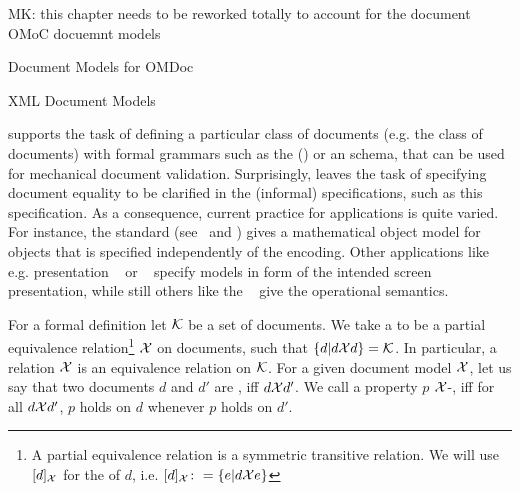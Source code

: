 \begin{oldpart}{MK: this chapter needs to be reworked totally to account for the document
    OMoC docuemnt models}
\begin{tchapter}[id=document-model]{Document Models for OMDoc}
\begin{tsection}[id=xml-DOM]{XML Document Models}

  {\xml} supports the task of defining a particular class of documents (e.g. the class of
  {\omdoc} documents) with formal grammars such as the {} ({}) or an {\xml} schema, that
  can be used for mechanical document validation.  Surprisingly, {\xml} leaves the task of
  specifying document equality to be clarified in the (informal) specifications, such as
  this {\omdoc} specification. As a consequence, current practice for {\xml}
  applications is quite varied. For instance, the {\openmath}
  standard (see~\cite{BusCapCar:2oms04} and {}) gives a mathematical
  object model for {\openmath} objects that is specified independently of the {\xml}
  encoding. Other {\xml} applications like e.g.  presentation
  {\mathml}~\cite{CarIon:MathML03} or {\xhtml}~\cite{W3C:xhtml2000} specify models in form
  of the intended screen presentation, while still others like the
  {\xslt}~\cite{Clark:xslt99} give the operational semantics.

  For a formal definition let ${\cal K}$ be a set of documents. We take a
  {} to be a partial equivalence relation\footnote{A partial
    equivalence relation is a symmetric transitive relation.  We will use $[d]_{\cal X}$ for
    the {} of $d$, i.e.  $[d]_{\cal X}\colon=\{e|d{{\cal X}}e\}$} ${\cal X}$
  on documents, such that $\{d|d{{\cal X}}d\}={\cal K}$. In particular, a relation ${\cal X}$ is an
  equivalence relation on ${\cal K}$.  For a given document model ${\cal X}$, let us say that two
  documents $d$ and $d'$ are {}, iff $d{{\cal X}}d'$. We call a property
  $p$ ${\cal X}$-{}, iff for
  all $d{{\cal X}}d'$, $p$ holds on $d$ whenever $p$ holds on $d'$.


\end{tsection}
\end{tchapter}
\end{oldpart}
